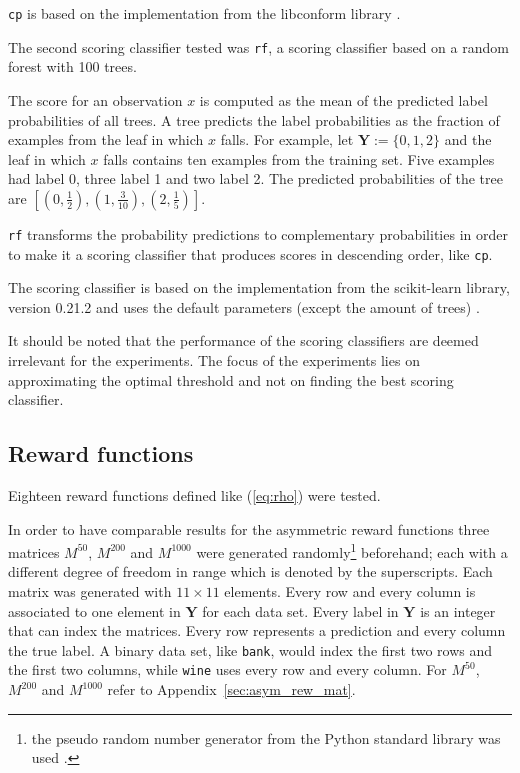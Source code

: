 \documentclass[twoside,11pt]{article}
\def\Y{\textbf{Y}}
\begin{document}
\texttt{cp} is based on the implementation from the
libconform library \citep[see][]{fassbender_2019}.

The second scoring classifier tested was \texttt{rf},
a scoring classifier based on a random forest with 100
trees.

The score for an observation $x$ is computed as the mean
of the predicted label probabilities of all trees.
A tree predicts the label probabilities as the fraction
of examples from the leaf in which $x$ falls.
For example, let $\Y := \{0,1,2\}$ and the leaf in which
$x$ falls contains ten examples from the training set.
Five examples had label 0, three label 1 and two label 2.
The predicted probabilities of the tree are
$[(0,\frac{1}{2}), (1,\frac{3}{10}), (2,\frac{1}{5})]$.

\texttt{rf} transforms the probability predictions to
complementary probabilities in order to make it a scoring
classifier that produces scores in descending order, like
\texttt{cp}.

The scoring classifier is based on the implementation from
the scikit-learn library, version 0.21.2 and uses the
default parameters (except the amount of trees)
\citep[see][]{sklearn_api}.

It should be noted that the performance of the scoring
classifiers are deemed irrelevant for the experiments.
The focus of the experiments lies on approximating the
optimal threshold and not on finding the best scoring
classifier.

\subsection{Reward functions}

Eighteen reward functions defined like (\ref{eq:rho}) were
tested.

In order to have comparable results for the asymmetric
reward functions three matrices $M^{50}$, $M^{200}$
and $M^{1000}$ were generated randomly\footnote{%
  the pseudo random number generator from the
  Python standard library was used
  \citep[see][Chapter 9.6]{python}.}
beforehand; each with a different degree of freedom in
range which is denoted by the superscripts.
Each matrix was generated with $11 \times 11$ elements.
Every row and every column is associated to one element
in $\Y$ for each data set.
Every label in $\Y$ is an integer that can index the
matrices.
Every row represents a prediction and every column the
true label.
A binary data set, like \texttt{bank}, would index the
first two rows and the first two columns, while
\texttt{wine} uses every row and every column.
For $M^{50}$, $M^{200}$ and $M^{1000}$ refer to
Appendix~\ref{sec:asym_rew_mat}.
\end{document}
